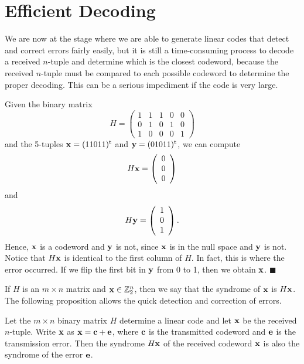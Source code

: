  
\section{Efficient Decoding}
 
 
We are now at the stage where we are able to generate linear codes
that detect and correct errors fairly easily, but it is still a 
time-consuming process to decode a received $n$-tuple and determine which
is the closest codeword, because the received $n$-tuple must be compared 
to each possible codeword to determine the proper decoding.
This can be a serious impediment if the code is very large.
 
 
\vspace{2ex}
 
 
Given the binary matrix
\[
H =
\left(
\begin{array}{ccccc}
1 & 1 & 1 & 0 & 0 \\
0 & 1 & 0 & 1 & 0 \\
1 & 0 & 0 & 0 & 1
\end{array}
\right)
\]
and the 5-tuples ${\bold x} = (11011)^{\rm t}$ and ${\bold y} =
(01011)^{\rm t}$, we can compute
\[
H{\bold x} =
\left(
\begin{array}{c} 0 \\ 0 \\ 0 \end{array}
\right)
\]
and
\[
H{\bold y} =
\left(
\begin{array}{c} 1 \\ 0 \\ 1 \end{array}
\right).
\]
Hence, ${\bold x}$ is a codeword and ${\bold y}$ is not, since
${\bold x}$ is in the null space and ${\bold y}$ is not. Notice that
$H{\bold x}$ is identical to the first column of $H$. In fact, this is
where the error occurred. If we flip the first bit in ${\bold y}$ from
0 to 1, then we obtain ${\bold x}$.  
\hspace{\fill} $\blacksquare$
 
 
\vspace{2ex}
 
 
If $H$ is an $m \times n$ matrix and ${\bold x} \in {\Bbb Z}_2^n$,
then we say that the {\bfi syndrome\/} of
${\bold x}$ is $H{\bold x}$. The following proposition allows
the quick detection and correction of errors.
 
 
\begin{proposition}
Let the $m \times n$ binary matrix $H$ determine a linear code and let
${\bold x}$ be the received $n$-tuple. Write ${\bold x}$ as ${\bold x}
=  {\bold c} +{\bold e}$, where ${\bold c}$ is the transmitted codeword
and ${\bold e}$ is the transmission error. Then the syndrome  $H{\bold
x}$ of the received codeword ${\bold x}$ is also the syndrome
of the error ${\bold e}$.
\end{proposition}
 
